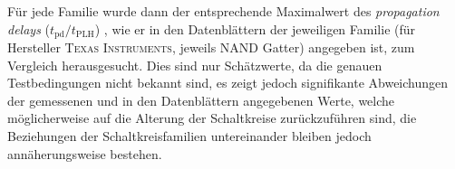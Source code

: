 Für jede Familie wurde dann der entsprechende Maximalwert des \textit{propagation delays}
($t_{\textrm{pd}} / t_\textrm{PLH}$) , wie er in den Datenblättern der
jeweiligen Familie (für Hersteller \textsc{Texas Instruments},
jeweils NAND Gatter) angegeben ist, zum Vergleich herausgesucht. 
Dies sind nur Schätzwerte, da die genauen Testbedingungen nicht bekannt sind, es
zeigt jedoch signifikante Abweichungen der gemessenen und in den Datenblättern
angegebenen Werte, welche möglicherweise auf die Alterung der Schaltkreise
zurückzuführen sind, die Beziehungen der Schaltkreisfamilien untereinander bleiben
jedoch annäherungsweise bestehen.
